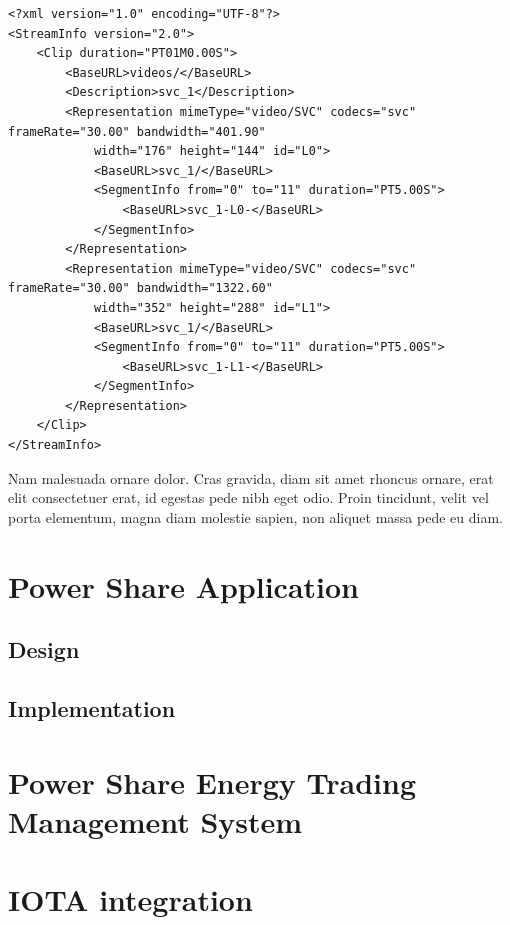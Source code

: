 \begin{minipage}[c]{0.95\textwidth}
\begin{center}
\begin{spacing}{0.5}
\begin{lstlisting}[frame=lines,style=XML,caption={Example of a MPD file.},label=mpd]
<?xml version="1.0" encoding="UTF-8"?>
<StreamInfo version="2.0">
    <Clip duration="PT01M0.00S">
        <BaseURL>videos/</BaseURL>
        <Description>svc_1</Description>
        <Representation mimeType="video/SVC" codecs="svc" frameRate="30.00" bandwidth="401.90"
            width="176" height="144" id="L0">
            <BaseURL>svc_1/</BaseURL>
            <SegmentInfo from="0" to="11" duration="PT5.00S">
                <BaseURL>svc_1-L0-</BaseURL>
            </SegmentInfo>
        </Representation>
        <Representation mimeType="video/SVC" codecs="svc" frameRate="30.00" bandwidth="1322.60"
            width="352" height="288" id="L1">
            <BaseURL>svc_1/</BaseURL>
            <SegmentInfo from="0" to="11" duration="PT5.00S">
                <BaseURL>svc_1-L1-</BaseURL>
            </SegmentInfo>
        </Representation>
    </Clip>
</StreamInfo>
\end{lstlisting}
\end{spacing}
\end{center}
\end{minipage}

Nam malesuada ornare dolor. Cras gravida, diam sit amet rhoncus ornare, erat elit consectetuer erat, id egestas pede nibh eget odio. Proin tincidunt, velit vel porta elementum, magna diam molestie sapien, non aliquet massa pede eu diam.
\section{Power Share Application}
\subsection{Design}
\subsection{Implementation}
\section{Power Share Energy Trading Management System}

\section{IOTA integration}

